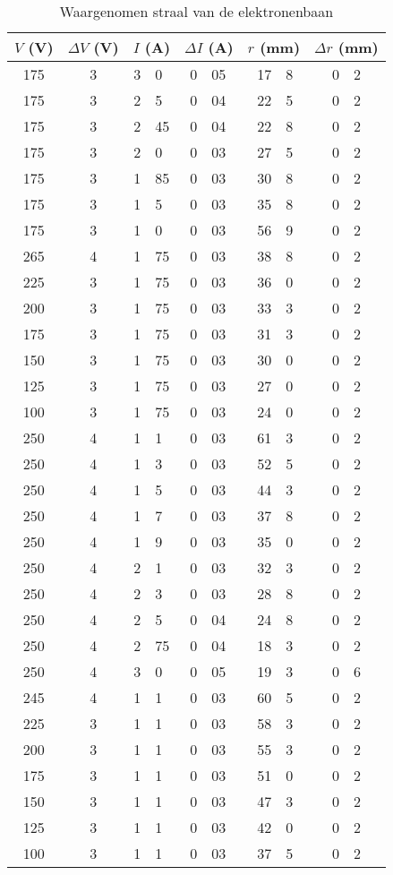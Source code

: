 \begin{table}
\caption{Waargenomen straal van de elektronenbaan}
\label{tabel-elektron}
\begin{center}
\begin{tabular}{c|c|r@{.}l|r@{.}l|r@{.}l|r@{.}l}
\multicolumn{1}{c|}{$V$ (V)}&
\multicolumn{1}{c|}{$\Delta V$ (V)}&
\multicolumn{2}{c|}{$I$ (A)}&
\multicolumn{2}{c|}{$\Delta I$ (A)}&
\multicolumn{2}{c|}{$r$ (mm)}&
\multicolumn{2}{c}{$\Delta r$ (mm)}\\\hline
175&	3&	3&0&	0&05&	17&8&	0&2\\
175&	3&	2&5&	0&04&	22&5&	0&2\\
175&	3&	2&45&	0&04&	22&8&	0&2\\
175&	3&	2&0&	0&03&	27&5&	0&2\\
175&	3&	1&85&	0&03&	30&8&	0&2\\
175&	3&	1&5&	0&03&	35&8&	0&2\\
175&	3&	1&0&	0&03&	56&9&	0&2\\\hline
265&	4&	1&75&	0&03&	38&8&	0&2\\
225&	3&	1&75&	0&03&	36&0&	0&2\\
200&	3&	1&75&	0&03&	33&3&	0&2\\
175&	3&	1&75&	0&03&	31&3&	0&2\\
150&	3&	1&75&	0&03&	30&0&	0&2\\
125&	3&	1&75&	0&03&	27&0&	0&2\\
100&	3&	1&75&	0&03&	24&0&	0&2\\\hline
250&	4&	1&1&	0&03&	61&3&	0&2\\
250&	4&	1&3&	0&03&	52&5&	0&2\\
250&	4&	1&5&	0&03&	44&3&	0&2\\
250&	4&	1&7&	0&03&	37&8&	0&2\\
250&	4&	1&9&	0&03&	35&0&	0&2\\
250&	4&	2&1&	0&03&	32&3&	0&2\\
250&	4&	2&3&	0&03&	28&8&	0&2\\
250&	4&	2&5&	0&04&	24&8&	0&2\\
250&	4&	2&75&	0&04&	18&3&	0&2\\
250&	4&	3&0&	0&05&	19&3&	0&6\\\hline
245&	4&	1&1&	0&03&	60&5&	0&2\\
225&	3&	1&1&	0&03&	58&3&	0&2\\
200&	3&	1&1&	0&03&	55&3&	0&2\\
175&	3&	1&1&	0&03&	51&0&	0&2\\
150&	3&	1&1&	0&03&	47&3&	0&2\\
125&	3&	1&1&	0&03&	42&0&	0&2\\
100&	3&	1&1&	0&03&	37&5&	0&2\\
\end{tabular}
\end{center}
\end{table}
